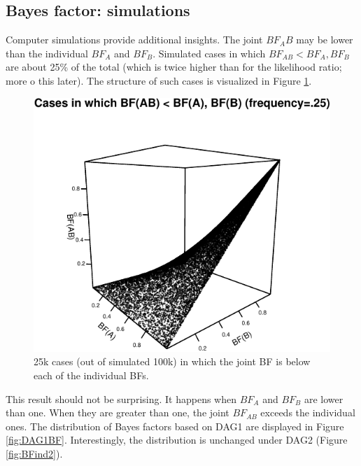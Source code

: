\documentclass[
  10pt,
  dvipsnames,enabledeprecatedfontcommands]{scrartcl}
\begin{document}
\hypertarget{bayes-factor-simulations}{%
\subsection*{Bayes factor: simulations}\label{bayes-factor-simulations}}

Computer simulations provide additional insights. The joint \(BF_AB\)
may be lower than the individual \(BF_A\) and \(BF_B\). Simulated cases
in which \(BF_{AB} < BF_{A}, BF_{B}\) are about 25\% of the total (which
is twice higher than for the likelihood ratio; more o this later). The
structure of such cases is visualized in Figure \ref{fig:BFfails}.

\vspace{1mm}
\footnotesize

\normalsize

\vspace{1mm}
\footnotesize

\normalsize

\begin{figure}

\begin{center}\includegraphics[width=0.8\linewidth]{conjunction-appendix14_files/figure-latex/unnamed-chunk-15-1} \end{center}
\caption{25k cases (out of simulated 100k) in which the joint BF is below each of the individual BFs.}
\label{fig:BFfails}
\end{figure}

\noindent This result should not be surprising. It happens when \(BF_A\)
and \(BF_B\) are lower than one. When they are greater than one, the
joint \(BF_{AB}\) exceeds the individual ones. The distribution of Bayes
factors based on \textsf{DAG1} are displayed in Figure \ref{fig:DAG1BF}.
Interestingly, the distribution is unchanged under \textsf{DAG2} (Figure
\ref{fig:BFind2}).
\end{document}
